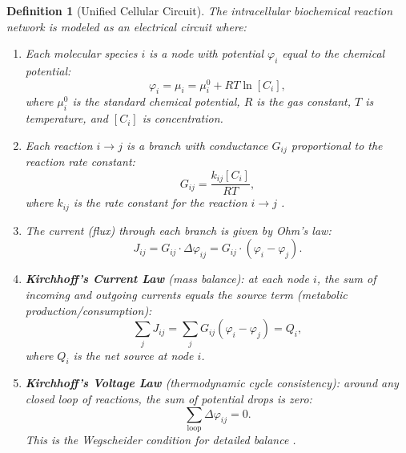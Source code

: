 \documentclass[11pt,twocolumn,a4paper]{article}
\newtheorem{definition}[theorem]{Definition}
\begin{document}
\begin{definition}[Unified Cellular Circuit]
\label{def:cellular-circuit}
The intracellular biochemical reaction network is modeled as an
electrical circuit where:
\begin{enumerate}[label=(\roman*),leftmargin=*]
\item Each molecular species $i$ is a \emph{node} with potential
  $\varphi_i$ equal to the chemical potential:
  \begin{equation}
  \varphi_i = \mu_i = \mu_i^0 + RT \ln [C_i],
  \label{eq:node-potential}
  \end{equation}
  where $\mu_i^0$ is the standard chemical potential, $R$ is the gas
  constant, $T$ is temperature, and $[C_i]$ is concentration.

\item Each reaction $i \to j$ is a \emph{branch} with conductance
  $G_{ij}$ proportional to the reaction rate constant:
  \begin{equation}
  G_{ij} = \frac{k_{ij} [C_i]}{RT},
  \label{eq:conductance}
  \end{equation}
  where $k_{ij}$ is the rate constant for the reaction $i \to j$
  \citep{michaelismenten1913,eyring1935,arrhenius1889}.

\item The current (flux) through each branch is given by Ohm's law:
  \begin{equation}
  J_{ij} = G_{ij} \cdot \Delta\varphi_{ij}
    = G_{ij} \cdot (\varphi_i - \varphi_j).
  \label{eq:ohm}
  \end{equation}

\item \textbf{Kirchhoff's Current Law} (mass balance): at each node
  $i$, the sum of incoming and outgoing currents equals the source
  term (metabolic production/consumption):
  \begin{equation}
  \sum_j J_{ij} = \sum_j G_{ij}(\varphi_i - \varphi_j) = Q_i,
  \label{eq:kcl}
  \end{equation}
  where $Q_i$ is the net source at node $i$.

\item \textbf{Kirchhoff's Voltage Law} (thermodynamic cycle
  consistency): around any closed loop of reactions, the sum of
  potential drops is zero:
  \begin{equation}
  \sum_{\text{loop}} \Delta\varphi_{ij} = 0.
  \label{eq:kvl}
  \end{equation}
  This is the Wegscheider condition for detailed balance
  \citep{onsager1931}.
\end{enumerate}
\end{definition}
\end{document}
